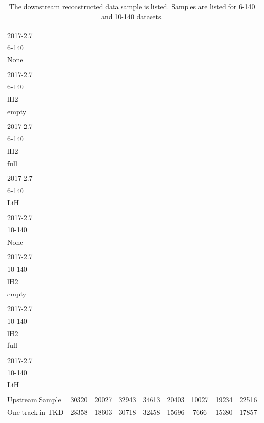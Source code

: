 \begin{landscape}
\begin{table}
\centering
\caption{The downstream reconstructed data sample is listed.  Samples are listed for 6-140 and 10-140 datasets.\label{tab:data_cuts_summary_1_1}}
\begin{tabular}[pos]{l|cccccccc}
                                                   & \splitcell{\\2017-2.7\\6-140\\None\\} & \splitcell{\\2017-2.7\\6-140\\lH2\\empty\\} & \splitcell{\\2017-2.7\\6-140\\lH2\\full\\} & \splitcell{\\2017-2.7\\6-140\\LiH\\} & \splitcell{\\2017-2.7\\10-140\\None\\} & \splitcell{\\2017-2.7\\10-140\\lH2\\empty\\} & \splitcell{\\2017-2.7\\10-140\\lH2\\full\\} & \splitcell{\\2017-2.7\\10-140\\LiH\\} \\
\hline                                            
Upstream Sample                                    &   30320  &   20027  &   32943  &   34613  &   20403  &   10027  &   19234  &   22516  \\
\hline                                            
One track in TKD                                   &   28358  &   18603  &   30718  &   32458  &   15696  &    7666  &   15380  &   17857  \\

\end{tabular}
\end{table}
\end{landscape}
